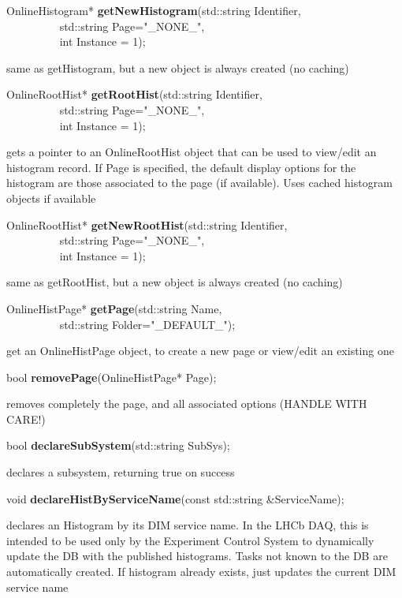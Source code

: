 \item    OnlineHistogram* {\bf getNewHistogram}(std::string Identifier,\\\mbox{}~~~~~~~~~
				   std::string Page="\_NONE\_",\\\mbox{}~~~~~~~~~
				   int Instance = 1);

 same as getHistogram, but a new object is always created (no caching)


\item    OnlineRootHist* {\bf getRootHist}(std::string Identifier,\\\mbox{}~~~~~~~~~
			       std::string Page="\_NONE\_",\\\mbox{}~~~~~~~~~
			       int Instance = 1);

 gets a pointer to an OnlineRootHist object that can be used to view/edit an histogram record. If Page
 is specified, the default display options for the histogram are those associated to the page (if available).
 Uses cached histogram objects if available


\item    OnlineRootHist* {\bf getNewRootHist}(std::string Identifier,\\\mbox{}~~~~~~~~~
				 std::string Page="\_NONE\_",\\\mbox{}~~~~~~~~~
				 int Instance = 1);

 same as getRootHist, but a new object is always created (no caching)


\item    OnlineHistPage* {\bf getPage}(std::string Name,\\\mbox{}~~~~~~~~~ std::string Folder="\_DEFAULT\_");


 get an OnlineHistPage object, to create a new page or view/edit an existing one


\item    bool {\bf removePage}(OnlineHistPage* Page);


 removes completely the page, and all associated options (HANDLE WITH CARE!)


\item    bool {\bf declareSubSystem}(std::string SubSys);


 declares a  subsystem, returning true on success


\item    void {\bf declareHistByServiceName}(const std::string \&ServiceName);


 declares an Histogram by its DIM service name. In the LHCb
 DAQ, this is intended to be used only by the Experiment Control
 System to dynamically update the DB with the published histograms.
 Tasks not known to the DB are automatically created.
 If histogram already exists, just updates the current DIM service name 


